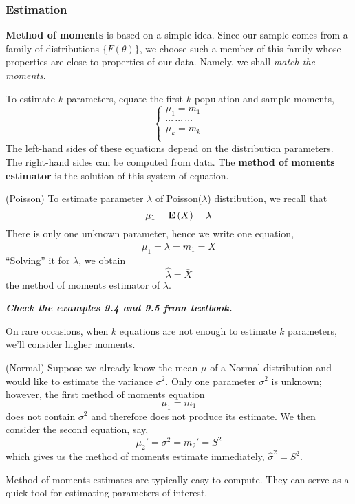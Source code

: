 \subsubsection{Estimation}
\label{subsubsec:estimation}

\textbf{Method of moments} is based on a simple idea. Since our sample comes from a family of distributions $\{ F(\theta) \}$, we choose such a member of this family whose properties are close to properties of our data. Namely, we shall \textit{match the moments}.

To estimate $k$ parameters, equate the first $k$ population and sample moments,
\begin{equation*}
  \begin{cases}
    \mu_1 = m_1 \\
    \cdots\ \cdots\ \cdots \\
    \mu_k = m_k \\
  \end{cases}
\end{equation*}
The left-hand sides of these equations depend on the distribution parameters. The right-hand sides can be computed from data. The \textbf{method of moments estimator} is the solution of this system of equation.

\begin{example}{ (Poisson)}
  To estimate parameter $\lambda$ of Poisson($\lambda$) distribution, we recall that
  \begin{equation*}
    \mu_1 = \mathbf{E}\left(X\right) = \lambda
  \end{equation*}
  There is only one unknown parameter, hence we write one equation,
  \begin{equation*}
    \mu_1 = \lambda = m_1 = \bar{X}
  \end{equation*}
  ``Solving'' it for $\lambda$, we obtain
  \begin{equation*}
    \hat{\lambda} = \bar{X}
  \end{equation*}
  the method of moments estimator of $\lambda$.
\end{example}

\textbf{\textit{Check the examples 9.4 and 9.5 from textbook.}}

\noindent On rare occasions, when $k$ equations are not enough to estimate $k$ parameters, we'll consider higher moments.

\vspace*{\fill}
\columnbreak

\begin{example}{ (Normal)}
  Suppose we already know the mean $\mu$ of a Normal distribution and would like to estimate the variance $\sigma^2$. Only one parameter $\sigma^2$ is unknown; however, the first method of moments equation
  \begin{equation*}
    \mu_1 = m_1
  \end{equation*}
  does not contain $\sigma^2$ and therefore does not produce its estimate. We then consider the second equation, say,
  \begin{equation*}
    \mu_2' = \sigma^2 = m_2' = S^2
  \end{equation*}
  which gives us the method of moments estimate immediately, $\hat{\sigma}^2 = S^2$.
\end{example}

Method of moments estimates are typically easy to compute. They can serve as a quick tool for estimating parameters of interest.
